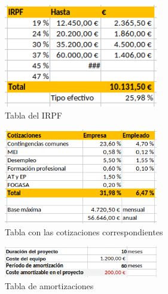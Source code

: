 \begin{figure}[h]
    \centering
        \centering
        \includegraphics[width=0.6\textwidth]{img/Personal_IRPF.png}
        \caption{Tabla del IRPF}
        \label{fig:irpf}
\end{figure}

\begin{figure}[h]
    \centering
        \centering
        \includegraphics[width=0.6\textwidth]{img/Personal_cotizaciones.png}
        \caption{Tabla con las cotizaciones correspondientes}
        \label{fig:cotiz}
\end{figure}

\begin{figure}[h]
    \centering
        \centering
        \includegraphics[width=0.6\textwidth]{img/Amortizaciones.png}
        \caption{Tabla de amortizaciones}
        \label{fig:amort}
\end{figure}